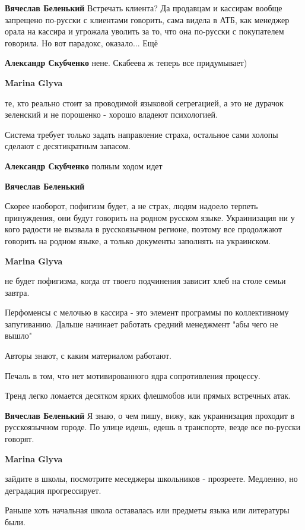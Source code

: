 \begin{itemize}
\begin{itemize}
\textbf{Вячеслав Беленький} Встречать клиента? Да продавцам и кассирам вообще запрещено по-русски с клиентами говорить, сама видела в АТБ, как менеджер орала на кассира и угрожала уволить за то, что она по-русски с покупателем говорила. Но вот парадокс, оказало... Ещё

\textbf{Александр Скубченко} нене.
Скабеева ж теперь все придумывает)

\textbf{Marina Glyva} 

те, кто реально стоит за проводимой языковой сегрегацией, а это не дурачок
зеленский и не порошенко - хорошо владеют психологией.

Система требует только задать направление страха, остальное сами холопы сделают с десятикратным запасом.


\textbf{Александр Скубченко} полным ходом идет

\textbf{Вячеслав Беленький} 

Скорее наоборот, пофигизм будет, а не страх, людям надоело терпеть принуждения,
они будут говорить на родном русском языке. Украинизация ни у кого радости не
вызвала в русскоязычном регионе, поэтому все продолжают говорить на родном
языке, а только документы заполнять на украинском.

\textbf{Marina Glyva} 

не будет пофигизма, когда от твоего подчинения зависит хлеб на столе семьи
завтра.

Перфоменсы с мелочью в кассира - это элемент программы по коллективному
запугиванию. Дальше начинает работать средний менеджмент "абы чего не вышло"

Авторы знают, с каким материалом работают.

Печаль в том, что нет мотивированного ядра сопротивления процессу.

Тренд легко ломается десятком ярких флешмобов или прямых встречных атак.

\textbf{Вячеслав Беленький} Я знаю, о чем пишу, вижу, как украинизация проходит в русскоязычном городе. По улице идешь, едешь в транспорте, везде все по-русски говорят.

\textbf{Marina Glyva} 

зайдите в школы, посмотрите меседжеры школьников - прозреете. Медленно, но
деградация прогрессирует.

Раньше хоть начальная школа оставалась или предметы языка или литературы были.


\end{itemize}
\end{itemize}
